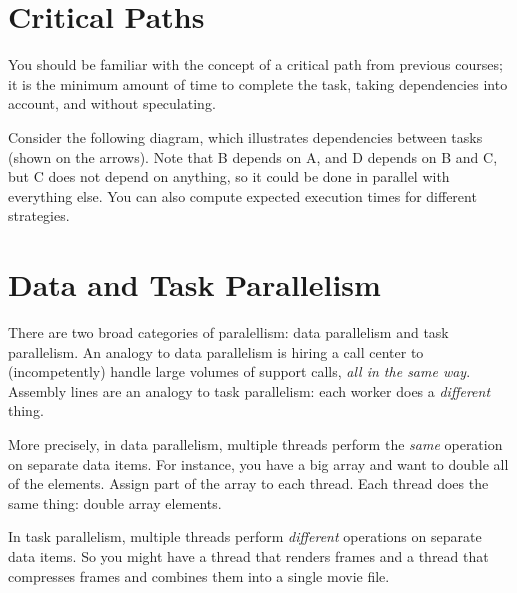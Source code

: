 




\section*{Critical Paths}
You should be familiar with the concept of a critical path from previous
courses; it is the minimum amount of time to complete the task, taking
dependencies into account, and without speculating.

Consider the following diagram, which illustrates dependencies between
tasks (shown on the arrows). 
Note that B depends on A, and D depends on B and C, but C does
not depend on anything, so it could be done in parallel with
everything else. You can also compute expected execution times
for different strategies.
\begin{center}
\end{center}

\section*{Data and Task Parallelism}
There are two broad categories of paralellism: data parallelism and
task parallelism. An analogy to data parallelism is hiring a call
center to (incompetently) handle large volumes of support calls,
\emph{all in the same way}. Assembly lines are an analogy to task
parallelism: each worker does a \emph{different} thing.

More precisely, in data parallelism, multiple threads perform the
\emph{same} operation on separate data items. For instance, you have a
big array and want to double all of the elements. Assign part of the
array to each thread. Each thread does the same thing: double array
elements.

In task parallelism, multiple threads perform \emph{different}
operations on separate data items. So you might have a thread that
renders frames and a thread that compresses frames and combines them
into a single movie file.

